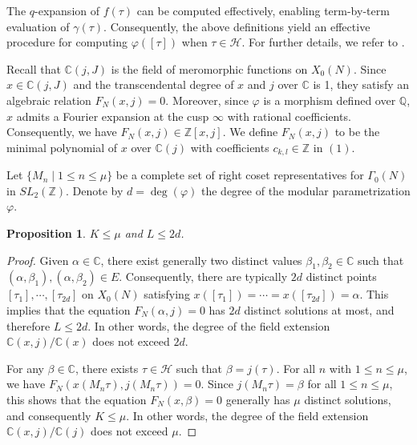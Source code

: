 \documentclass[10pt, a4paper]{article}
\newtheorem{proposition}[theorem]{Proposition}
\begin{document}
The $q$-expansion of $f(\tau)$ can be computed effectively, enabling term-by-term evaluation of $\gamma(\tau)$. Consequently, the above definitions yield an effective procedure for computing $\varphi([\tau])$ when $\tau \in \mathcal{H}$.  For further details, we refer to \cite{Cohen1,Delaunay}.

Recall that \(  \mathbb{C}(j, J) \) is  the field of meromorphic functions on \( X_0(N) \).
Since \( x \in  \mathbb{C}(j, J) \) and the transcendental degree of \( x \) and \( j \) over \( \mathbb{C} \) is 1, they  satisfy an algebraic relation \( F_N(x, j) = 0 \). Moreover, since  \( \varphi \) is a morphism defined over \( \mathbb{Q} \), \( x \) admits a Fourier expansion at the cusp \( \infty \) with rational coefficients. Consequently, we have $F_N(x, j) \in \mathbb{Z}[x, j].$  We define \( F_N(x, j) \) to be the minimal  polynomial of  \( x \) over
 \(\mathbb{C}(j) \) with coefficients $c_{k,l}\in \mathbb{Z}$ in $(1)$.

Let \(\{M_n \mid 1 \leq n \leq \mu\}\) be a complete set of right coset representatives for \(\Gamma_0(N)\) in \( SL_2(\mathbb{Z}) \). Denote by \( d = \deg(\varphi) \) the degree of the modular parametrization \( \varphi \).

\begin{proposition}
$K \leq \mu$ and $L \leq 2d$.
\end{proposition}

\begin{proof}
Given $\alpha \in \mathbb{C}$,  there exist generally  two distinct values $\beta_1, \beta_2 \in \mathbb{C}$ such that $(\alpha, \beta_1), (\alpha, \beta_2) \in E$. Consequently, there are typically $2d$ distinct points $[\tau_1], \cdots, [\tau_{2d}]$ on $X_0(N)$ satisfying $x([\tau_1]) = \cdots = x([\tau_{2d}]) = \alpha$.
This implies that the equation $F_N(\alpha, j) = 0$ has $2d$ distinct solutions at most, and therefore $L \leq 2d$. In other words, the degree of the field extension $\mathbb{C}(x, j)/\mathbb{C}(x)$ does not exceed $2d$.

For any $\beta \in \mathbb{C}$, there exists $\tau \in \mathcal{H}$ such that $\beta = j(\tau)$. For all $n$ with $1 \leq n \leq \mu$, we have $F_N(x(M_n \tau), j(M_n \tau)) = 0.$
Since $j(M_n \tau) = \beta$ for all $1 \leq n \leq \mu$, this shows that the equation $F_N(x, \beta) = 0$ generally has $\mu$ distinct solutions, and consequently $K \leq \mu$.  In other words, the degree of the field extension $\mathbb{C}(x, j)/\mathbb{C}(j)$ does not exceed $\mu$.
\end{proof}
\end{document}
